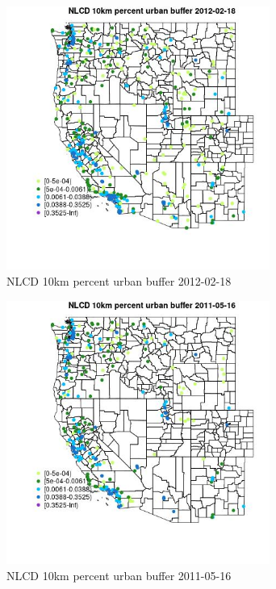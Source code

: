 \begin{figure} 
\centering  
\includegraphics[width=0.77\textwidth]{Code_Outputs/Report_ML_input_PM25_Step4_part_f_de_duplicated_aveswNAs_MapObsNLCD_10km_percent_urban_buffer2012-02-18.jpg} 
\caption{\label{fig:Report_ML_input_PM25_Step4_part_f_de_duplicated_aveswNAsMapObsNLCD_10km_percent_urban_buffer2012-02-18}NLCD 10km percent urban buffer 2012-02-18} 
\end{figure} 
 

\begin{figure} 
\centering  
\includegraphics[width=0.77\textwidth]{Code_Outputs/Report_ML_input_PM25_Step4_part_f_de_duplicated_aveswNAs_MapObsNLCD_10km_percent_urban_buffer2011-05-16.jpg} 
\caption{\label{fig:Report_ML_input_PM25_Step4_part_f_de_duplicated_aveswNAsMapObsNLCD_10km_percent_urban_buffer2011-05-16}NLCD 10km percent urban buffer 2011-05-16} 
\end{figure} 
 

